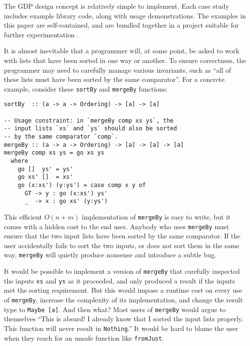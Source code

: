 \documentclass[format=sigplan, review=false, screen=true]{acmart}
\makeatletter
\let\origsection\section
\renewcommand\section{\@ifstar{\starsection}{\nostarsection}}
\newcommand\nostarsection[1]
{\sectionprelude\origsection{#1}\sectionpostlude}
\newcommand\starsection[1]
{\sectionprelude\origsection*{#1}\sectionpostlude}
\newcommand\sectionprelude{%
  \vspace{-0.5em}
}
\newcommand\sectionpostlude{%
  \vspace{0em}
}
\makeatother
\begin{document}
The GDP design concept is relatively simple to implement. Each case study includes example library code,
along with usage demonstrations. The examples in this paper are self-contained, and are bundled together in
a project suitable for further experimentation \cite{this}.


\section{Case Study \#1: Sorted lists}

It is almost inevitable that a programmer will, at some point, be asked to work
with lists that have been sorted in one way or another. To ensure correctness,
the programmer may need to carefully manage various invariants, such
as ``all of these lists must have been sorted by the same comparator''. For a concrete
example, consider these \texttt{sortBy} and \texttt{mergeBy} functions:
\begin{verbatim}
sortBy  :: (a -> a -> Ordering) -> [a] -> [a]

-- Usage constraint: in `mergeBy comp xs ys`, the
-- input lists `xs` and `ys` should also be sorted
-- by the same comparator `comp`.
mergeBy :: (a -> a -> Ordering) -> [a] -> [a] -> [a]
mergeBy comp xs ys = go xs ys
  where
    go []  ys' = ys'
    go xs' []  = xs'
    go (x:xs') (y:ys') = case comp x y of
      GT -> y : go (x:xs') ys'
      _  -> x : go xs' (y:ys')
\end{verbatim}
This efficient $O(n+m)$ implementation of \texttt{mergeBy} is easy to write,
but it comes with a hidden cost to the end user. Anybody who uses \texttt{mergeBy}
must ensure that the two input lists have been sorted by the same comparator.
If the user accidentally fails to sort the two inputs, or does not sort them in the same way,
\texttt{mergeBy} will quietly produce nonsense and introduce a subtle bug.

It would be possible to implement a version of \texttt{mergeBy} that
carefully inspected the inputs \texttt{xs} and \texttt{ys} as it
proceeded, and only produced a result if the inputs met the sorting
requirement. But this would impose a runtime cost on every use of
\texttt{mergeBy}, increase the complexity of its implementation,
and change the result type to \texttt{Maybe [a]}. And then what?
Most users of \texttt{mergeBy} would argue to themselves ``This is
absurd! I already know that I sorted the input lists properly. This
function will never result in \texttt{Nothing}.'' It would be hard
to blame the user when they reach for an  unsafe function like
\texttt{fromJust}.
\end{document}
